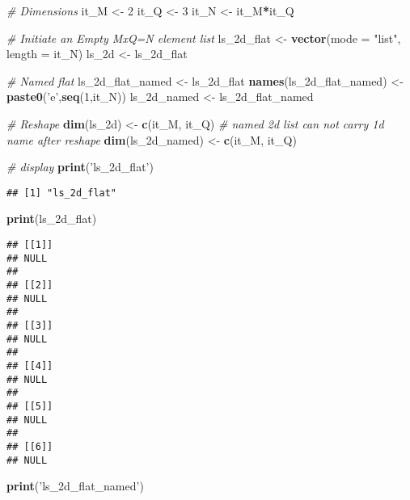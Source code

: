 \documentclass[
]{book}
\newenvironment{Shaded}{\begin{snugshade}}{\end{snugshade}}
\newcommand{\CommentTok}[1]{\textcolor[rgb]{0.56,0.35,0.01}{\textit{#1}}}
\newcommand{\DataTypeTok}[1]{\textcolor[rgb]{0.13,0.29,0.53}{#1}}
\newcommand{\DecValTok}[1]{\textcolor[rgb]{0.00,0.00,0.81}{#1}}
\newcommand{\KeywordTok}[1]{\textcolor[rgb]{0.13,0.29,0.53}{\textbf{#1}}}
\newcommand{\NormalTok}[1]{#1}
\newcommand{\OperatorTok}[1]{\textcolor[rgb]{0.81,0.36,0.00}{\textbf{#1}}}
\newcommand{\StringTok}[1]{\textcolor[rgb]{0.31,0.60,0.02}{#1}}
\begin{document}
\begin{Shaded}
\begin{Highlighting}[]
\CommentTok{# Dimensions}
\NormalTok{it_M <-}\StringTok{ }\DecValTok{2}
\NormalTok{it_Q <-}\StringTok{ }\DecValTok{3}
\NormalTok{it_N <-}\StringTok{ }\NormalTok{it_M}\OperatorTok{*}\NormalTok{it_Q}

\CommentTok{# Initiate an Empty MxQ=N element list}
\NormalTok{ls_2d_flat <-}\StringTok{ }\KeywordTok{vector}\NormalTok{(}\DataTypeTok{mode =} \StringTok{"list"}\NormalTok{, }\DataTypeTok{length =}\NormalTok{ it_N)}
\NormalTok{ls_2d <-}\StringTok{ }\NormalTok{ls_2d_flat}

\CommentTok{# Named flat}
\NormalTok{ls_2d_flat_named <-}\StringTok{ }\NormalTok{ls_2d_flat}
\KeywordTok{names}\NormalTok{(ls_2d_flat_named) <-}\StringTok{ }\KeywordTok{paste0}\NormalTok{(}\StringTok{'e'}\NormalTok{,}\KeywordTok{seq}\NormalTok{(}\DecValTok{1}\NormalTok{,it_N))}
\NormalTok{ls_2d_named <-}\StringTok{ }\NormalTok{ls_2d_flat_named}

\CommentTok{# Reshape}
\KeywordTok{dim}\NormalTok{(ls_2d) <-}\StringTok{ }\KeywordTok{c}\NormalTok{(it_M, it_Q)}
\CommentTok{# named 2d list can not carry 1d name after reshape}
\KeywordTok{dim}\NormalTok{(ls_2d_named) <-}\StringTok{ }\KeywordTok{c}\NormalTok{(it_M, it_Q)}

\CommentTok{# display}
\KeywordTok{print}\NormalTok{(}\StringTok{'ls_2d_flat'}\NormalTok{)}
\end{Highlighting}
\end{Shaded}

\begin{verbatim}
## [1] "ls_2d_flat"
\end{verbatim}

\begin{Shaded}
\begin{Highlighting}[]
\KeywordTok{print}\NormalTok{(ls_2d_flat)}
\end{Highlighting}
\end{Shaded}

\begin{verbatim}
## [[1]]
## NULL
## 
## [[2]]
## NULL
## 
## [[3]]
## NULL
## 
## [[4]]
## NULL
## 
## [[5]]
## NULL
## 
## [[6]]
## NULL
\end{verbatim}

\begin{Shaded}
\begin{Highlighting}[]
\KeywordTok{print}\NormalTok{(}\StringTok{'ls_2d_flat_named'}\NormalTok{)}
\end{Highlighting}
\end{Shaded}
\end{document}
